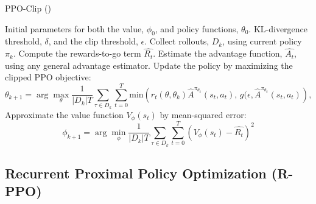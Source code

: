\begin{algorithm}[htbp]
\caption{PPO-Clip (\cite{schulman2017proximal})} 
\label{alg:PPO-Clip}

\begin{algorithmic}[1]
\State {} Initial parameters for both the value, $\phi_0$, and policy functions, $\theta_0$.
\State {} KL-divergence threshold, $\delta$, and the clip threshold, $\epsilon$.
    \State Collect rollouts, $D_k$, using current policy $\pi_k$.
    \State Compute the rewards-to-go term $\hat{R_t}$. 
    \State Estimate the advantage function, $\hat{A_t}$, using any general advantage estimator.
    \State Update the policy by maximizing the clipped PPO objective: 
    \begin{equation*}
    \theta_{k+1} = \arg \max_{\theta} \frac{1}{|D_k| T} \sum_{\tau \in D_k} \sum_{t=0}^{T} \text{min}\left (r_t(\theta, \theta_k) \hat{A}^{\pi_{\theta_k}}(s_t, a_t)\text{, }g(\epsilon, \hat{A}^{\pi_{\theta_k}}(s_t, a_t)\right),
    \end{equation*}
    \State Approximate the value function $V_{\phi}(s_t)$ by mean-squared error:
    \begin{equation*}
    \phi_{k+1} = \arg \min_{\phi} \frac{1}{|D_k| T} \sum_{\tau \in D_k} \sum_{t=0}^{T} \left( V_\phi(s_t) - \hat{R_t} \right)^2
    \end{equation*}
\EndFor
\end{algorithmic}
\end{algorithm}

\subsection{Recurrent Proximal Policy Optimization (R-PPO)}
\label{sec:rppo}

